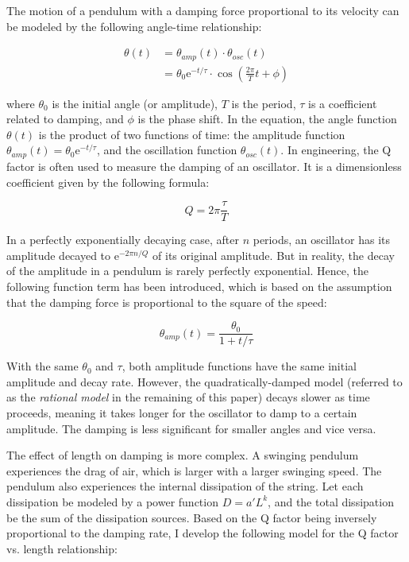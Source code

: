 \documentclass[12pt]{article}
\newcommand{\e}{\mathrm{e}}
\begin{document}
The motion of a pendulum with a damping force proportional to its velocity can be modeled by the following angle-time relationship: ~\cite{hyperphysics-oscda}

\begin{equation}
\label{equ:damped-osc}
\begin{aligned}
\theta(t)
&= \theta_{amp}(t) \cdot \theta_{osc}(t) \\
&= \theta_0 \e^{-t/\tau} \cdot \cos\left(\frac{2\pi}{T}t+\phi\right)
\end{aligned}
\end{equation}

where $\theta_0$ is the initial angle (or amplitude), $T$ is the period, $\tau$ is a coefficient related to damping, and $\phi$ is the phase shift. In the equation, the angle function $\theta(t)$ is the product of two functions of time: the amplitude function $\theta_{amp}(t)=\theta_0\e^{-t/\tau}$, and the oscillation function $\theta_{osc}(t)$. In engineering, the Q factor is often used to measure the damping of an oscillator. It is a dimensionless coefficient given by the following formula: ~\cite{wikipedia-q}

\begin{equation}
\label{equ:q}
Q=2\pi\frac{\tau}{T}
\end{equation}

In a perfectly exponentially decaying case, after $n$ periods, an oscillator has its amplitude decayed to $\e^{-2\pi n/Q}$ of its original amplitude. But in reality, the decay of the amplitude in a pendulum is rarely perfectly exponential. Hence, the following function term has been introduced, which is based on the assumption that the damping force is proportional to the square of the speed: ~\cite{quadratic-damp}

\begin{equation}
\label{equ:quadratic-damp}
\theta_{amp}(t) = \frac{\theta_0}{1+t/\tau}
\end{equation}

With the same $\theta_0$ and $\tau$, both amplitude functions have the same initial amplitude and decay rate. However, the quadratically-damped model (referred to as the \textit{rational model} in the remaining of this paper) decays slower as time proceeds, meaning it takes longer for the oscillator to damp to a certain amplitude. The damping is less significant for smaller angles and vice versa.

The effect of length on damping is more complex. A swinging pendulum experiences the drag of air, which is larger with a larger swinging speed. The pendulum also experiences the internal dissipation of the string. {\cite{pbm2001}} Let each dissipation be modeled by a power function $D=a'L^k$, and the total dissipation be the sum of the dissipation sources. Based on the Q factor being inversely proportional to the damping rate, I develop the following model for the Q factor vs. length relationship:
\end{document}
